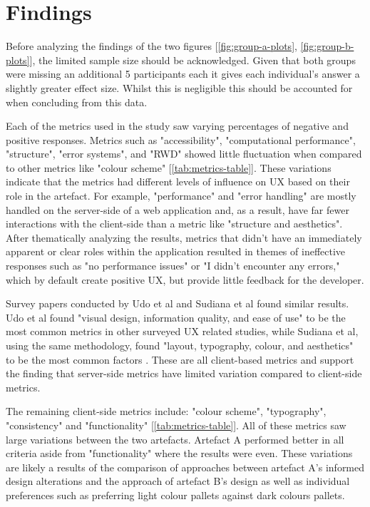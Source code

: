 \documentclass[article]{IEEEtran}
\begin{document}
    \section{Findings}
        Before analyzing the findings of the two figures [\autoref{fig:group-a-plots}, \autoref{fig:group-b-plots}], the limited sample size should be acknowledged. Given that both groups were missing an additional 5 participants each it gives each individual's answer a slightly greater effect size. Whilst this is negligible this should be accounted for when concluding from this data.
        
        Each of the metrics used in the study saw varying percentages of negative and positive responses. Metrics such as "accessibility", "computational performance", "structure", "error systems", and "RWD" showed little fluctuation when compared to other metrics like "colour scheme" [\autoref{tab:metrics-table}]. These variations indicate that the metrics had different levels of influence on UX based on their role in the artefact. For example, "performance" and "error handling" are mostly handled on the server-side of a web application and, as a result, have far fewer interactions with the client-side than a metric like "structure and aesthetics". After thematically analyzing the results, metrics that didn't have an immediately apparent or clear roles within the application resulted in themes of ineffective responses such as "no performance issues" or "I didn't encounter any errors," which by default create positive UX, but provide little feedback for the developer.

        Survey papers conducted by Udo et al and Sudiana et al found similar results. Udo et al found "visual design, information quality, and ease of use" \cite{udo} to be the most common metrics in other surveyed UX related studies, while Sudiana et al, using the same methodology, found "layout, typography, colour, and aesthetics" to be the most common factors \cite{sudiana}. These are all client-based metrics and support the finding that server-side metrics have limited variation compared to client-side metrics.

        The remaining client-side metrics include: "colour scheme", "typography", "consistency" and "functionality" [\autoref{tab:metrics-table}]. All of these metrics saw large variations between the two artefacts. Artefact A performed better in all criteria aside from "functionality" where the results were even. These variations are likely a results of the comparison of approaches between artefact A's informed design alterations and the approach of artefact B's design as well as individual preferences such as preferring light colour pallets against dark colours pallets.
\end{document}
